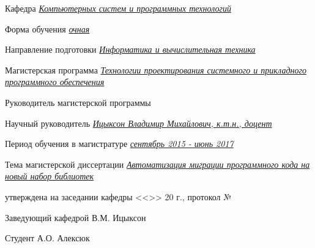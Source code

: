 \begin{flushleft}
    Кафедра \uline{\textit{Компьютерных систем и программных технологий} \hfill}

    \uline{\hfill}

    Форма обучения \uline{\textit{очная} \hfill}

    Направление подготовки \uline{\textit{Информатика и вычислительная техника} \hfill}

    \uline{\hfill}

    Магистерская программа \textit{\uline{Технологии проектирования системного и прикладного программного обеспечения\hfill}}

    \vspace{1em}

    Руководитель магистерской программы \uline{\hfill}

    \uline{\hfill}

    Научный руководитель \uline{\textit{Ицыксон Владимир Михайлович, к.т.н., доцент} \hfill}

    Период обучения в магистратуре \uline{\textit{сентябрь 2015 - июнь 2017} \hfill}

    Тема магистерской диссертации \textit{\uline{Автоматизация миграции программного кода на новый набор библиотек \hfill}}

    \vspace{1em}

    утверждена на заседании кафедры <<\uline{\hphantom{200}}>> \uline{\hphantom{декабрь}}
    20\uline{\hphantom{130}} г., протокол № \uline{\hphantom{1300}}

    \vspace{1em}

    Заведующий кафедрой \uline{\hfill} В.М. Ицыксон

    \vspace{1em}

    Студент \uline{\hfill} А.О. Алексюк
\end{flushleft}

